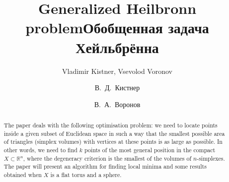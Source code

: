 \begin{englishtitle}
\title{Generalized Heilbronn problem}
\author{Vladimir Kistner, Vsevolod Voronov}

\maketitle

\begin{abstract}
The paper deals with the following optimisation problem: we need to locate points inside a given subset of Euclidean space in such a way that the smallest possible area of triangles (simplex volumes) with vertices at these points is as large as possible. In other words, we need to find $k$ points of the most general position in the compact $X \subset \mathbb{R}^n$, where the degeneracy criterion is the smallest of the volumes of $n$-simplexes. The paper will present an algorithm for finding local minima and some results obtained when $X$ is a flat torus and a sphere.

\end{abstract}
\end{englishtitle}


\iffalse
\documentclass[12pt]{llncs}
\usepackage[T2A]{fontenc}
\usepackage[utf8]{inputenc}
\usepackage[english,russian]{babel}
\usepackage[russian]{nla}




\fi

\title{Обобщенная задача Хейльбрённа%
}
\author{В.~Д.~Кистнер
  \and
  В.~А.~Воронов
} 


